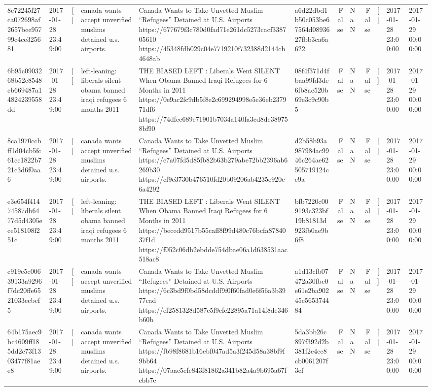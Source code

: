 \begin{tabular}{llllllrlrlll}
8c72245f27ca072698af2657bee95799c4ce325681 & 2017-01-28 23:49:00 & [] & canada wants accept unverified muslims detained u.s. airports. & Canada Wants to Take Unvetted Muslim “Refugees” Detained at U.S. Airports https://677679f3c780d0fad71e261dc5273cacf338705610 https://45348fdb029c04e7719210f732388d2144cb4648ab & a6d22dbd1b50c053be67564d0893627fbb3ca6a622 & False & NaN & False & [] & 2017-01-28 23:00:00 & 2017-01-29 00:00:00 \\
6b95c0903268b52c8548cb669487a14824239558dd & 2017-01-28 23:49:00 & [] & left-leaning: liberals silent obama banned iraqi refugees 6 months 2011 & THE BIASED LEFT : Liberals Went SILENT When Obama Banned Iraqi Refugees for 6 Months in 2011 https://0e9ac2fc9db5f8e2c699294998e5e36eb237971df6 https://74dfce689e71901b7034a140fa3cd8de389758bf90 & 08f4f371d4fbaa99fd3de6fb8ac520b69e3c9c90b5 & False & NaN & False & [] & 2017-01-28 23:00:00 & 2017-01-29 00:00:00 \\
8ca1970ccbff1d04cb5fc61cc1822b721c3d6f0aa6 & 2017-01-28 23:49:00 & [] & canada wants accept unverified muslims detained u.s. airports. & Canada Wants to Take Unvetted Muslim “Refugees” Detained at U.S. Airports https://e7a07fd5d85fb82b63b279abe72bb2396ab6269b30 https://cf9c3730b476510fd20b09206ab4235e920e6a4292 & d2b58b93a987984ac9946c264ae62505719124ce9a & False & NaN & False & [] & 2017-01-28 23:00:00 & 2017-01-29 00:00:00 \\
e3e654f41474587db6477d5d4305ece518108f251c & 2017-01-28 23:49:00 & [] & left-leaning: liberals silent obama banned iraqi refugees 6 months 2011 & THE BIASED LEFT : Liberals Went SILENT When Obama Banned Iraqi Refugees for 6 Months in 2011 https://becedd9517b55caff8f99d480c76bcfa8784037f1d https://f052c06db2ebdde754dbae06a1d638531aac518ac8 & bfb7220c009193c323bf19b81813d923fb0ae9b6f8 & False & NaN & False & [] & 2017-01-28 23:00:00 & 2017-01-29 00:00:00 \\
c919e5c00639133a9296f7dc20ffe6521033ecbcf5 & 2017-01-28 23:49:00 & [] & canada wants accept unverified muslims detained u.s. airports. & Canada Wants to Take Unvetted Muslim “Refugees” Detained at U.S. Airports https://6c3bd9f0bd58dcddf9f0f60fad0e6f56a3b3977cad https://ef2581328d587c5f9cfc22895a71a14f8de346b60b & a1d13cfb07472a30fbe0e61e2ba90245e565374484 & False & NaN & False & [] & 2017-01-28 23:00:00 & 2017-01-29 00:00:00 \\
64b175aec9bc4609ff185dd2c73f1303477f81aee8 & 2017-01-28 23:49:00 & [] & canada wants accept unverified muslims detained u.s. airports. & Canada Wants to Take Unvetted Muslim “Refugees” Detained at U.S. Airports https://fb98f8681b16ebf047ad5a3f245d58a38bf9f9bb64 https://07aac5efc843f81862a341b82a4a9b695a67fcbb7e & 5da3bb26c897f392d2b381f2e4ee8cb0061207f3ef & False & NaN & False & [] & 2017-01-28 23:00:00 & 2017-01-29 00:00:00 \\

\end{tabular}
